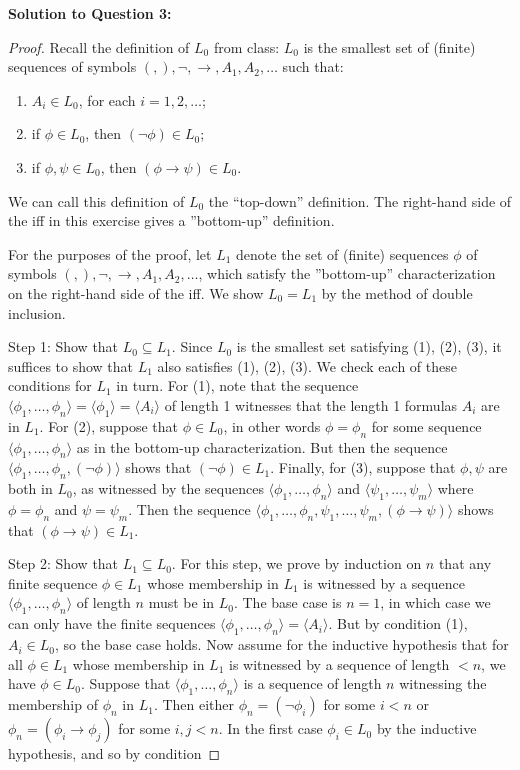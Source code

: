 \documentclass{article}
\begin{document}
\textbf{Solution to Question 3:}
\begin{proof}
Recall the definition of \(L_0\) from class: \(L_0\) is the smallest set of (finite) sequences of symbols \((, ), \neg, \to, A_1, A_2, \ldots\) such that:
\begin{enumerate}
    \item \(A_i \in L_0\), for each \(i = 1, 2, \ldots\);
    \item if \(\phi \in L_0\), then \((\neg \phi) \in L_0\);
    \item if \(\phi, \psi \in L_0\), then \((\phi \to \psi) \in L_0\).
\end{enumerate}

We can call this definition of \(L_0\) the “top-down” definition. The right-hand side of the iff in this exercise gives a ”bottom-up” definition.

For the purposes of the proof, let \(L_1\) denote the set of (finite) sequences \(\phi\) of symbols \((, ), \neg, \to, A_1, A_2, \ldots\), which satisfy the ”bottom-up” characterization on the right-hand side of the iff. We show \(L_0 = L_1\) by the method of double inclusion.

Step 1: Show that \(L_0 \subseteq L_1\). Since \(L_0\) is the smallest set satisfying (1), (2), (3), it suffices to show that \(L_1\) also satisfies (1), (2), (3). We check each of these conditions for \(L_1\) in turn. For (1), note that the sequence \(\langle \phi_1, \ldots, \phi_n \rangle = \langle \phi_1 \rangle = \langle A_i \rangle\) of length 1 witnesses that the length 1 formulas \(A_i\) are in \(L_1\). For (2), suppose that \(\phi \in L_0\), in other words \(\phi = \phi_n\) for some sequence \(\langle \phi_1, \ldots, \phi_n \rangle\) as in the bottom-up characterization. But then the sequence \(\langle \phi_1, \ldots, \phi_n, (\neg \phi) \rangle\) shows that \((\neg \phi) \in L_1\). Finally, for (3), suppose that \(\phi, \psi\) are both in \(L_0\), as witnessed by the sequences \(\langle \phi_1, \ldots, \phi_n \rangle\) and \(\langle \psi_1, \ldots, \psi_m \rangle\) where \(\phi = \phi_n\) and \(\psi = \psi_m\). Then the sequence \(\langle \phi_1, \ldots, \phi_n, \psi_1, \ldots, \psi_m, (\phi \to \psi) \rangle\) shows that \((\phi \to \psi) \in L_1\).

Step 2: Show that \(L_1 \subseteq L_0\). For this step, we prove by induction on \(n\) that any finite sequence \(\phi \in L_1\) whose membership in \(L_1\) is witnessed by a sequence \(\langle \phi_1, \ldots, \phi_n \rangle\) of length \(n\) must be in \(L_0\). The base case is \(n = 1\), in which case we can only have the finite sequences \(\langle \phi_1, \ldots, \phi_n \rangle = \langle A_i \rangle\). But by condition (1), \(A_i \in L_0\), so the base case holds. Now assume for the inductive hypothesis that for all \(\phi \in L_1\) whose membership in \(L_1\) is witnessed by a sequence of length \(< n\), we have \(\phi \in L_0\). Suppose that \(\langle \phi_1, \ldots, \phi_n \rangle\) is a sequence of length \(n\) witnessing the membership of \(\phi_n\) in \(L_1\). Then either \(\phi_n = (\neg \phi_i)\) for some \(i < n\) or \(\phi_n = (\phi_i \to \phi_j)\) for some \(i, j < n\). In the first case \(\phi_i \in L_0\) by the inductive hypothesis, and so by condition


\end{proof}
\end{document}
